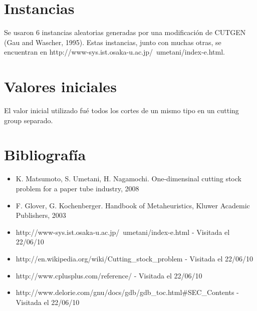 \documentclass[letter,10pt]{article}
\begin{document}
\section{Instancias}
Se usaron 6 instancias aleatorias generadas por una modificaci\'on de CUTGEN (Gau and Wascher, 1995).
Estas instancias, junto con muchas otras, se encuentran en http://www-sys.ist.osaka-u.ac.jp/~umetani/index-e.html.

\section{Valores iniciales}
El valor inicial utilizado fu\'e todos los cortes de un mismo tipo en un cutting group separado.

\newpage
\section{Bibliograf\'ia}
\begin{itemize}
 \item K. Matsumoto, S. Umetani, H. Nagamochi. One-dimensinal cutting stock problem for a paper tube industry, 2008
 \item F. Glover, G. Kochenberger. Handbook of Metaheuristics, Kluwer Academic Publishers, 2003
 \item http://www-sys.ist.osaka-u.ac.jp/~umetani/index-e.html - Visitada el 22/06/10
 \item http://en.wikipedia.org/wiki/Cutting\_stock\_problem - Visitada el 22/06/10
 \item http://www.cplusplus.com/reference/ - Visitada el 22/06/10
 \item http://www.delorie.com/gnu/docs/gdb/gdb\_toc.html\#SEC\_Contents - Visitada el 22/06/10
\end{itemize}
\end{document}

